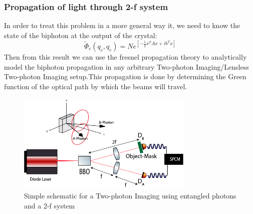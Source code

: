 \subsubsection{Propagation of light through 2-f system}

In order to treat this problem in a more general way it, we need to know 
the state of the biphoton at the output of the crystal:
\begin{equation}
\label{eq:crystal}
\tilde{\Phi}_c(q_c,q_c)=N e^{\left[ -\frac{1}{2}x^T A x + i b^T x \right]}
\end{equation}
Then from this result we can use the fresnel propagation theory to analytically model the biphoton 
propagation in any arbitrary Two-photon Imaging/Lensless Two-photon Imaging setup.This propagation is done 
by determining the Green function of the optical path by which the beams will travel.


\begin{figure}[h]
\centering
\includegraphics[width=0.75\textwidth]{Figures/simpleTwo.png}
\caption{Simple schematic for a Two-photon Imaging using entangled photons and a 2-f system} 
\label{fig:2f}
\end{figure}
 

